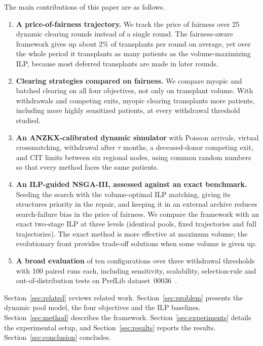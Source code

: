 \documentclass[journal]{IEEEtran}
\begin{document}
The main contributions of this paper are as follows.
\begin{enumerate}
  \item \textbf{A price-of-fairness trajectory.}
    We track the price of fairness over 25 dynamic clearing rounds
    instead of a single round. The fairness-aware framework gives up
    about 2\% of transplants per round on average, yet over the whole
    period it transplants as many patients as the volume-maximizing
    ILP, because most deferred transplants are made in later rounds.
  \item \textbf{Clearing strategies compared on fairness.}
    We compare myopic and batched clearing on all four objectives, not
    only on transplant volume. With withdrawals and competing exits,
    myopic clearing transplants more patients, including more highly
    sensitized patients, at every withdrawal threshold studied.
  \item \textbf{An ANZKX-calibrated dynamic simulator} with Poisson
    arrivals, virtual crossmatching, withdrawal after $\tau$ months, a
    deceased-donor competing exit, and CIT limits between six regional
    nodes, using common random numbers so that every method faces the
    same patients.
  \item \textbf{An ILP-guided NSGA-III, assessed against an exact
    benchmark.} Seeding the search with the volume-optimal ILP
    matching, giving its structures priority in the repair, and
    keeping it in an external archive reduces search-failure bias in
    the price of fairness. We compare the framework with an exact
    two-stage ILP at three levels (identical pools, fixed
    trajectories and full trajectories). The exact method is more
    effective at maximum volume; the evolutionary front provides
    trade-off solutions when some volume is given up.
  \item \textbf{A broad evaluation} of ten configurations over
    three withdrawal thresholds with 100 paired runs each, including
    sensitivity, scalability, selection-rule and out-of-distribution
    tests on PrefLib dataset~00036~\cite{mattei2013preflib}.
\end{enumerate}
Section~\ref{sec:related} reviews related work.
Section~\ref{sec:problem} presents the dynamic pool model, the four
objectives and the ILP baselines.
Section~\ref{sec:method} describes the framework.
Section~\ref{sec:experiments} details the experimental setup, and
Section~\ref{sec:results} reports the results.
Section~\ref{sec:conclusion} concludes.
\end{document}
